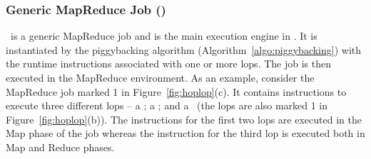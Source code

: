 \subsubsection{Generic MapReduce Job (\gmr)}




\gmr\ is a generic MapReduce job and is the main execution engine in \systemmltext.
It is instantiated by the piggybacking algorithm (Algorithm~\ref{algo:piggybacking}) with 
the runtime instructions associated with one or more lops. The job is then executed in the 
MapReduce environment. As an example, consider the MapReduce job marked 1 in 
Figure~\ref{fig:hoplop}(c). It contains instructions to execute three different lops -- a 
\datalop; a \translop; and a \mmcjlop\ (the lops are also marked 1 in 
Figure~\ref{fig:hoplop}(b)). The instructions for the first two lops are executed in the 
Map phase of the job whereas the instruction for the third lop is executed both in Map 
and Reduce phases. 


